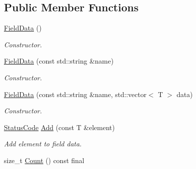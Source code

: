 \subsection*{Public Member Functions}
\begin{DoxyCompactItemize}
\item 
\mbox{\label{classmilvus_1_1_field_data_a07a2afd71e1f0c672e4169e5fa5bd70c}} 
\hyperlink{classmilvus_1_1_field_data_a07a2afd71e1f0c672e4169e5fa5bd70c}{Field\+Data} ()
\begin{DoxyCompactList}\small\item\em Constructor. \end{DoxyCompactList}\item 
\mbox{\label{classmilvus_1_1_field_data_abc700f708941ddd6cebd614423fc4516}} 
\hyperlink{classmilvus_1_1_field_data_abc700f708941ddd6cebd614423fc4516}{Field\+Data} (const std\+::string \&name)
\begin{DoxyCompactList}\small\item\em Constructor. \end{DoxyCompactList}\item 
\mbox{\label{classmilvus_1_1_field_data_a15749c5f25ce3c2bd003057dbde1f4a4}} 
\hyperlink{classmilvus_1_1_field_data_a15749c5f25ce3c2bd003057dbde1f4a4}{Field\+Data} (const std\+::string \&name, std\+::vector$<$ T $>$ data)
\begin{DoxyCompactList}\small\item\em Constructor. \end{DoxyCompactList}\item 
\mbox{\label{classmilvus_1_1_field_data_a7d47878b5dd868ba848ceb5684052374}} 
\hyperlink{namespacemilvus_ad8f8a6a0abb456a62ed9fec3f2ff1f23}{Status\+Code} \hyperlink{classmilvus_1_1_field_data_a7d47878b5dd868ba848ceb5684052374}{Add} (const T \&element)
\begin{DoxyCompactList}\small\item\em Add element to field data. \end{DoxyCompactList}\item 
\mbox{\label{classmilvus_1_1_field_data_a1764d48b5ea51236dc31dc5b2e9473d3}} 
size\+\_\+t \hyperlink{classmilvus_1_1_field_data_a1764d48b5ea51236dc31dc5b2e9473d3}{Count} () const final

\end{DoxyCompactItemize}
